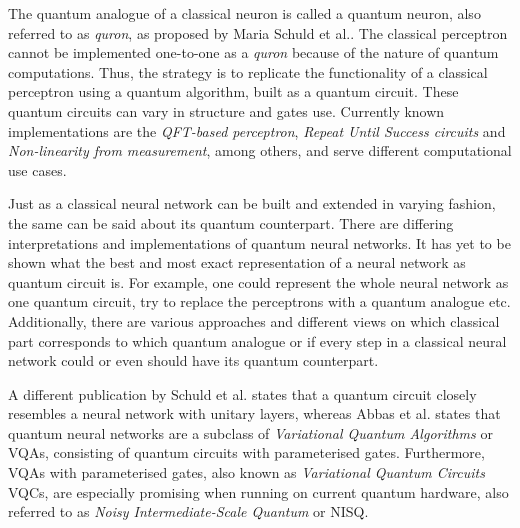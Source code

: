 \vspace{2em}
The quantum analogue of a classical neuron is called a quantum neuron, also referred to as \textit{quron}, as proposed by Maria Schuld et al.\cite{schuldQuestQuantumNeural2014a}. The classical perceptron cannot be implemented one-to-one as a \textit{quron} because of the nature of quantum computations. Thus, the strategy is to replicate the functionality of a classical perceptron using a quantum algorithm, built as a quantum circuit. These quantum circuits can vary in structure and gates use. Currently known implementations are the \textit{QFT-based perceptron}\cite{SchuldSimulatingAPerceptron_2015}, \textit{Repeat Until Success circuits}\cite{QuantumNeuronAnElementaryBuildingBlock,Torrontegui_2019} and \textit{Non-linearity from measurement}\cite{tacchinoArtificialNeuronImplemented2019}, among others\cite{AltaiskyQuantumNeuralNetwork,DesignOfQuantumNeuronModel}, and serve different computational use cases.\par
Just as a classical neural network can be built and extended in varying fashion, the same can be said about its quantum counterpart. There are differing interpretations and implementations of quantum neural networks\cite{Mangini_2021,Mitarai_2018,ClassificationWithQNN,QNNConceptsApplicationsChallenges,Killoran_2019}. It has yet to be shown what the best and most exact representation of a neural network as quantum circuit is. For example, one could represent the whole neural network as one quantum circuit, try to replace the perceptrons with a quantum analogue etc.\cite{OnQuantumNeuralNetworks,Ezhov2000,schuldQuestQuantumNeural2014a} Additionally, there are various approaches and different views on which classical part corresponds to which quantum analogue or if every step in a classical neural network could or even should have its quantum counterpart\cite{OnQuantumNeuralNetworks,Ezhov2000,schuldQuestQuantumNeural2014a}. \par
A different publication by Schuld et al.\cite{schuldCircuitcentricQuantumClassifiers2020} states that a quantum circuit closely resembles a neural network with unitary layers, whereas Abbas et al.\cite{Abbas_2021,schuldCircuitcentricQuantumClassifiers2020} states that quantum neural networks are a subclass of \textit{Variational Quantum Algorithms} or VQAs, consisting of quantum circuits with parameterised gates. Furthermore, VQAs with parameterised gates, also known as \textit{Variational Quantum Circuits} VQCs, are especially promising when running on current quantum hardware, also referred to as \textit{Noisy Intermediate-Scale Quantum} or NISQ. 

